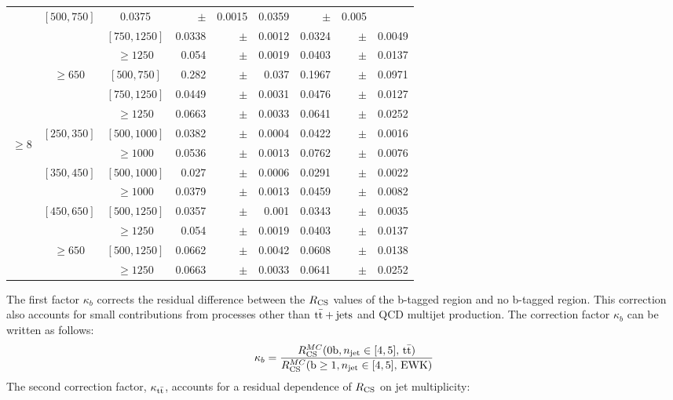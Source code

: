 \begin{table}[ht]
\begin{center}
{\begin{tabular}{|c|c|c|rrr|rrr|}
&$[500,750]$
 & 0.0375&$\pm$&0.0015& 0.0359&$\pm$&0.005
 \\
&
&$[750,1250]$
 & 0.0338&$\pm$&0.0012& 0.0324&$\pm$&0.0049
 \\
&
&$\geq1250$
 & 0.054&$\pm$&0.0019& 0.0403&$\pm$&0.0137
 \\
\cline{2-9}
&\multirow{3}{*}{$\geq650$}
&$[500,750]$
 & 0.282&$\pm$&0.037& 0.1967&$\pm$&0.0971
 \\
&
&$[750,1250]$
 & 0.0449&$\pm$&0.0031& 0.0476&$\pm$&0.0127
 \\
&
&$\geq1250$
 & 0.0663&$\pm$&0.0033& 0.0641&$\pm$&0.0252
 \\
\cline{2-9}
\hline
\hline
\multirow{8}{*}{\begin{sideways}$\geq8$\end{sideways}}
&\multirow{2}{*}{$[250,350]$}
&$[500,1000]$
 & 0.0382&$\pm$&0.0004& 0.0422&$\pm$&0.0016
 \\
&
&$\geq1000$
 & 0.0536&$\pm$&0.0013& 0.0762&$\pm$&0.0076
 \\
\cline{2-9}
&\multirow{2}{*}{$[350,450]$}
&$[500,1000]$
 & 0.027&$\pm$&0.0006& 0.0291&$\pm$&0.0022
 \\
&
&$\geq1000$
 & 0.0379&$\pm$&0.0013& 0.0459&$\pm$&0.0082
 \\
\cline{2-9}
&\multirow{2}{*}{$[450,650]$}
&$[500,1250]$
 & 0.0357&$\pm$&0.001& 0.0343&$\pm$&0.0035
 \\
&
&$\geq1250$
 & 0.054&$\pm$&0.0019& 0.0403&$\pm$&0.0137
 \\
\cline{2-9}
&\multirow{2}{*}{$\geq650$}
&$[500,1250]$
 & 0.0662&$\pm$&0.0042& 0.0608&$\pm$&0.0138
 \\
&
&$\geq1250$
 & 0.0663&$\pm$&0.0033& 0.0641&$\pm$&0.0252
 \\
\cline{2-9}
\hline\end{tabular}}\end{center}\end{table}
The first factor $\kappa_b$ corrects the residual difference between the $R_{\rm CS}$ values of the b-tagged region and no b-tagged region. This correction also accounts for small contributions from processes other than ${\rm t\bar{t}+jets}$ and QCD multijet production. The correction factor $\kappa_b$ can be written as follows:
\begin{equation}
\label{eq:kappaB}
{\kappa_b} = \frac{R_{\rm CS}^{MC}({\rm 0b} , n_{\rm jet} \in [4,5] , \,\rm t\bar{t} )}{R_{\rm CS}^{MC}({\rm b} \geq 1 , n_{\rm jet} \in [4,5] , {\rm \,EWK} )} 
\end{equation}
The second correction factor, $\kappa_{\rm t\bar{t}}$, accounts for a residual dependence of $R_{\rm CS}$ on jet multiplicity:
